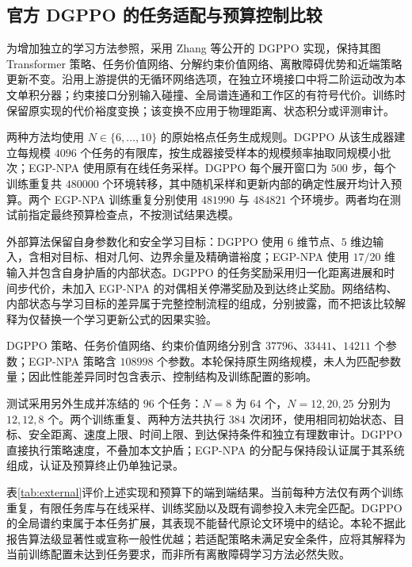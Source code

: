 \subsection{官方 DGPPO 的任务适配与预算控制比较}\label{subsec:external}
为增加独立的学习方法参照，采用 Zhang 等\cite{zhang2025dgppo}公开的 DGPPO 实现，保持其图 Transformer 策略、任务价值网络、分解约束价值网络、离散障碍优势和近端策略更新不变。沿用上游提供的无循环网络选项，在独立环境接口中将二阶运动改为本文单积分器；约束接口分别输入碰撞、全局谱连通和工作区的有符号代价。训练时保留原实现的代价裕度变换；该变换不应用于物理距离、状态积分或评测审计。

两种方法均使用 $N\in\{6,\ldots,10\}$ 的原始格点任务生成规则。DGPPO 从该生成器建立每规模 $4096$ 个任务的有限库，按生成器接受样本的规模频率抽取同规模小批次；EGP-NPA 使用原有在线任务采样。DGPPO 每个展开窗口为 $500$ 步，每个训练重复共 $480000$ 个环境转移，其中随机采样和更新内部的确定性展开均计入预算。两个 EGP-NPA 训练重复分别使用 $481990$ 与 $484821$ 个环境步。两者均在测试前指定最终预算检查点，不按测试结果选模。

外部算法保留自身参数化和安全学习目标：DGPPO 使用 $6$ 维节点、$5$ 维边输入，含相对目标、相对几何、边界余量及精确谱裕度；EGP-NPA 使用 $17/20$ 维输入并包含自身护盾的内部状态。DGPPO 的任务奖励采用归一化距离进展和时间步代价，未加入 EGP-NPA 的对偶相关停滞奖励及到达终止奖励。网络结构、内部状态与学习目标的差异属于完整控制流程的组成，分别披露，而不把该比较解释为仅替换一个学习更新公式的因果实验。

DGPPO 策略、任务价值网络、约束价值网络分别含 $37796$、$33441$、$14211$ 个参数；EGP-NPA 策略含 $108998$ 个参数。本轮保持原生网络规模，未人为匹配参数量；因此性能差异同时包含表示、控制结构及训练配置的影响。

测试采用另外生成并冻结的 $96$ 个任务：$N=8$ 为 $64$ 个，$N=12,20,25$ 分别为 $12,12,8$ 个。两个训练重复、两种方法共执行 $384$ 次闭环，使用相同初始状态、目标、安全距离、速度上限、时间上限、到达保持条件和独立有理数审计。DGPPO 直接执行策略速度，不叠加本文护盾；EGP-NPA 的分配与保持段认证属于其系统组成，认证及预算终止仍单独记录。




表\ref{tab:external}评价上述实现和预算下的端到端结果。当前每种方法仅有两个训练重复，有限任务库与在线采样、训练奖励以及既有调参投入未完全匹配。DGPPO 的全局谱约束属于本任务扩展，其表现不能替代原论文环境中的结论。本轮不据此报告算法级显著性或宣称一般性优越；若适配策略未满足安全条件，应将其解释为当前训练配置未达到任务要求，而非所有离散障碍学习方法必然失败。
